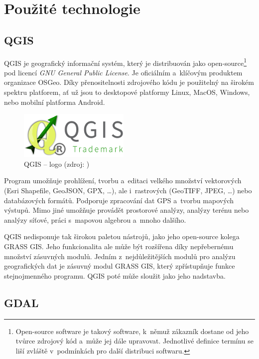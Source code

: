 \documentclass[a4paper,12pt,oneside]{book}
\begin{document}
\clearpage
\chapter{Použité technologie}

\section{QGIS}

QGIS je geografický informační systém, který je distribuován jako open-source\footnote{Open-source software je takový software, k~němuž zákazník dostane od jeho tvůrce zdrojový kód a~může jej dále upravovat. Jednotlivé definice termínu  se liší zvláště v~podmínkách pro další distribuci softwaru.\cite{abclinuxu_opensource}} pod licencí \textit{GNU General Public License}. Je oficiálním a~klíčovým produktem organizace OSGeo. Díky přenositelnosti zdrojového kódu je použitelný na širokém spektru platforem, ať už jsou to desktopové platformy Linux, MacOS, Windows, nebo mobilní platforma Android.

\begin{figure}[htb]
\centering
\includegraphics[scale=1]{images/qgis-logo.png}
\caption[QGIS -- logo]{QGIS -- logo (zdroj: \cite{qgis})}
\end{figure}

Program umožňuje prohlížení, tvorbu a~editaci velkého množství vektorových (Esri Shapefile, GeoJSON, GPX, \dots), ale i~rastrových (GeoTIFF, JPEG, \dots) nebo databázových formátů. Podporuje zpracování dat GPS a~tvorbu mapových výstupů. Mimo jiné umožňuje provádět prostorové analýzy, analýzy terénu nebo analýzy síťové, práci s~mapovou algebrou a~mnoho dalšího.

QGIS nedisponuje tak širokou paletou nástrojů, jako jeho open-source kolega GRASS GIS. Jeho funkcionalita ale může být rozšířena díky nepřebernému množství zásuvných modulů. Jedním z~nejdůležitějších modulů pro analýzu geografických dat je zásuvný modul GRASS GIS, který zpřístupňuje funkce stejnojmenného programu. QGIS poté může sloužit jako jeho nadstavba.
\cite{qgis}
\cite{qgis_wiki}


\section{GDAL}
\label{l_gdal}
\end{document}
